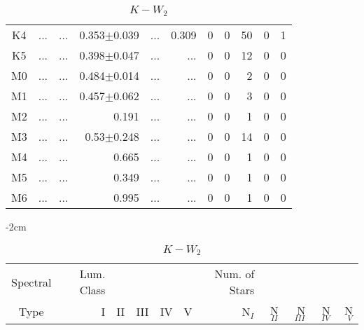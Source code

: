 \begin{table}[t]
\begin{table}[t]
\begin{center}
\begin{tabular}{c|rrrrr|rrrrr}
    K4	&	 ...	&	 ...	&	0.353$\pm$0.039	&	 ...	&	0.309	&	0	&	0	&	50	&	0	&	1	\\
    K5	&	 ...	&	 ...	&	0.398$\pm$0.047	&	 ...	&	 ...	&	0	&	0	&	12	&	0	&	0	\\
    M0	&	 ...	&	 ...	&	0.484$\pm$0.014	&	 ...	&	 ...	&	0	&	0	&	2	&	0	&	0	\\
    M1	&	 ...	&	 ...	&	0.457$\pm$0.062	&	 ...	&	 ...	&	0	&	0	&	3	&	0	&	0	\\
    M2	&	 ...	&	 ...	&	0.191	&	 ...	&	 ...	&	0	&	0	&	1	&	0	&	0	\\
    M3	&	 ...	&	 ...	&	0.53$\pm$0.248	&	 ...	&	 ...	&	0	&	0	&	14	&	0	&	0	\\
    M4	&	 ...	&	 ...	&	0.665	&	 ...	&	 ...	&	0	&	0	&	1	&	0	&	0	\\
    M5	&	 ...	&	 ...	&	0.349	&	 ...	&	 ...	&	0	&	0	&	1	&	0	&	0	\\
    M6	&	 ...	&	 ...	&	0.995	&	 ...	&	 ...	&	0	&	0	&	1	&	0	&	0	\\
        \bottomrule
        \end{tabular}
    \end{center}
    \end{table}
    
    
    \begin{table}[t]
    \tiny
    \centering
    \caption{$K-W_{2}$}
    \begin{center}
        \addtolength{\leftskip} {-2cm}
        \addtolength{\rightskip}{-2cm}
        \begin{tabular}{c|rrrrr|rrrrr}
        \toprule
        Spectral & Lum. Class & & & & & Num. of Stars & & & &  \\
        Type & I & II & III &  IV & V & N$_{I}$ & N$_{II}$ & N$_{III}$ & N$_{IV}$ & N$_{V}$ \\ \midrule
     

\end{tabular}
\end{center}
\end{table}
\end{table}
